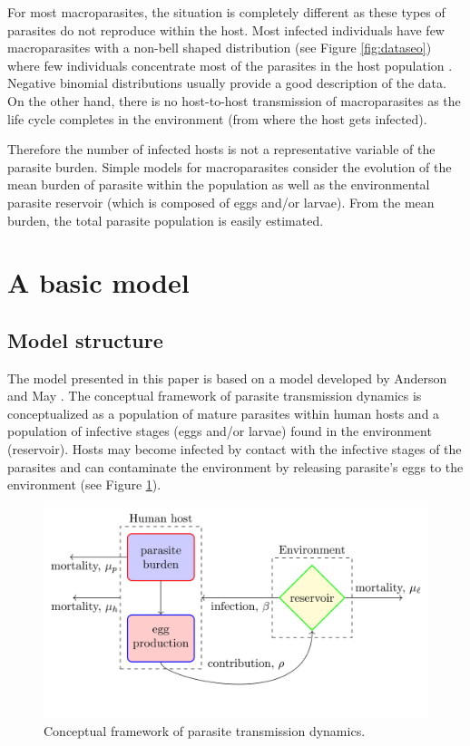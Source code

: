 \documentclass[eng]{MMSB-class-eng}
\begin{document}
For most macroparasites, the situation is completely different as these types of parasites do not reproduce within the host.  Most  infected  individuals have few macroparasites with a non-bell shaped distribution (see Figure \ref{fig:dataseo}) where few individuals concentrate most of the parasites in the host population \citep{seo1979frequency,lopez2022simple}. Negative binomial distributions usually provide a good description of the data. On the other hand, there is no host-to-host transmission of macroparasites as the life cycle completes in the environment (from where the host gets infected).  


Therefore the number of infected hosts is not a representative variable of the parasite burden. Simple models for macroparasites consider the evolution of the mean burden of parasite within the population as well as the environmental parasite reservoir (which is composed of eggs and/or larvae). From the mean burden, the total parasite population is easily estimated. 


\section{A basic model}
\label{s:basicmodel}

\subsection{Model structure}
\label{ss:structure}
The model presented in this paper is based on a model developed by Anderson and May \citep{anderson1992infectious,anderson1985helminth}.
The conceptual framework of parasite transmission dynamics is conceptualized as a population of mature parasites within human hosts and a population of infective stages (eggs and/or larvae) found in the environment (reservoir).
Hosts may become infected by contact with the infective stages of the parasites 
and can contaminate the environment by releasing parasite's eggs to the environment (see Figure \ref{f:diagram}). 
\begin{figure}[h!]
	\centering
	\includegraphics[width=0.99\linewidth]{diagram}
	\caption{Conceptual framework of parasite transmission dynamics.}
	\label{f:diagram}
\end{figure}
\end{document}
